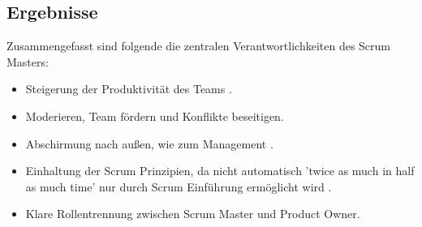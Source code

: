 \documentclass[5pt, final]{beamer}
\begin{document}
\begin{frame}[t]
\begin{multicols}{3}
			
			
			
			\section{Ergebnisse}
			Zusammengefasst sind folgende die zentralen Verantwortlichkeiten des Scrum Masters:
            \begin{itemize}
    			\item Steigerung der Produktivität des Teams \cite{vantighem24}.
    			\item Moderieren, Team fördern und Konflikte beseitigen.
    			\item Abschirmung nach außen, wie zum Management \cite{meindl12}.
                \item Einhaltung der Scrum Prinzipien, da nicht automatisch 'twice as much in half as much time' nur durch Scrum Einführung ermöglicht wird \cite{sutherland14}.
                \item Klare Rollentrennung zwischen Scrum Master und Product Owner.
            \end{itemize}
			
			

\end{multicols}
\end{frame}
\end{document}
